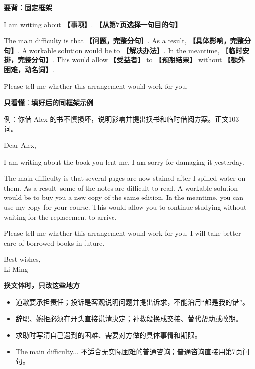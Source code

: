 \documentclass[11pt,a4paper,fontset=macnew]{ctexart}
\newenvironment{english}{\begingroup\fontsize{11}{15}\selectfont\setlength{\parskip}{4pt}}{\par\endgroup}
\newenvironment{example}{\begingroup\fontsize{10.5}{14}\selectfont\setlength{\parskip}{4pt}}{\par\endgroup}
\begin{document}
\par\vspace{5pt}\noindent\textbf{要背：固定框架}\par\nopagebreak
\begin{english}
I am writing about \textbf{【事项】}. \textbf{【从第7页选择一句目的句】}

The main difficulty is that \textbf{【问题，完整分句】}. As a result, \textbf{【具体影响，完整分句】}. A workable solution would be to \textbf{【解决办法】}. In the meantime, \textbf{【临时安排，完整分句】}. This would allow \textbf{【受益者】} to \textbf{【预期结果】} without \textbf{【额外困难，动名词】}.

Please tell me whether this arrangement would work for you.

\end{english}
\par\vspace{5pt}\noindent\textbf{只看懂：填好后的同框架示例}\par\nopagebreak
{\small 例：你借 Alex 的书不慎损坏，说明影响并提出换书和临时借阅方案。\quad 正文103词。}\par
\begin{example}
Dear Alex,\par
I am writing about the book you lent me. I am sorry for damaging it yesterday.

The main difficulty is that several pages are now stained after I spilled water on them. As a result, some of the notes are difficult to read. A workable solution would be to buy you a new copy of the same edition. In the meantime, you can use my copy for your course. This would allow you to continue studying without waiting for the replacement to arrive.

Please tell me whether this arrangement would work for you. I will take better care of borrowed books in future.

Best wishes,\\Li Ming\par
\end{example}
\par\vspace{5pt}\noindent\textbf{换文体时，只改这些地方}\par\nopagebreak
{\small\begin{itemize}
\item 道歉要承担责任；投诉是客观说明问题并提出诉求，不能沿用“都是我的错”。
\item 辞职、婉拒必须在开头直接说清决定；补救段换成交接、替代帮助或改期。
\item 求助时写清自己遇到的困难、需要对方做的具体事情和期限。
\item The main difficulty... 不适合无实际困难的普通咨询；普通咨询直接用第7页问句。
\end{itemize}}
\end{document}
